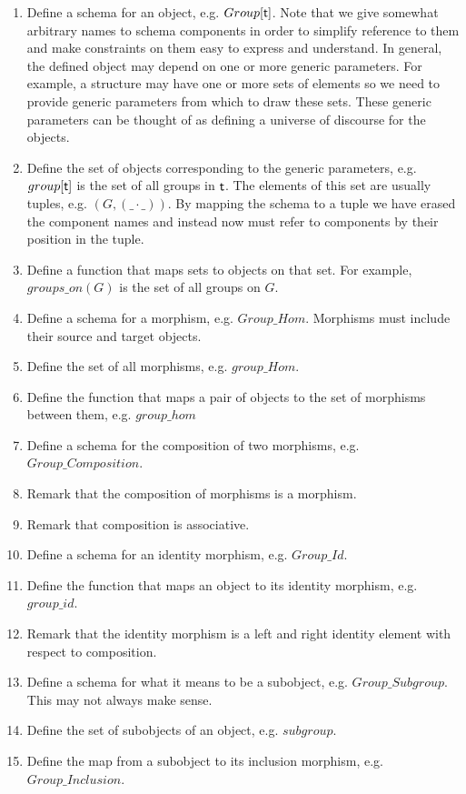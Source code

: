 \documentclass{amsart}
\begin{document}
\begin{enumerate}
	\item Define a schema for an object, e.g. $Group[\mathsf{t}]$. 
	Note that we give somewhat arbitrary names to schema components in order to
	simplify reference to them and make constraints on them easy to express and understand.
	In general, the defined object may depend on one or more generic parameters. 
	For example, a structure may have one or more sets of elements so we need to provide
	generic parameters from which to draw these sets.
	These generic parameters can be thought of as defining a universe of discourse for the objects.
	\item Define the set of objects corresponding to the generic parameters, e.g. $group[\mathsf{t}]$
	is the set of all groups in $\mathsf{t}$.
	The elements of this set are usually tuples, e.g. $(G, (\_ \cdot \_))$. 
	By mapping the schema to a tuple we have erased the component names and 
	instead now must refer to components by their position in the tuple.
	\item Define a function that maps sets to objects on that set. For example, $groups\_on(G)$
	is the set of all groups on $G$.
	\item Define a schema for a morphism, e.g. $Group\_Hom$.
	Morphisms must include their source and target objects.
	\item Define the set of all morphisms, e.g. $group\_Hom$.
	\item Define the function that maps a pair of objects to the set of morphisms between them,
	e.g. $group\_hom$
	\item Define a schema for the composition of two morphisms, e.g. $Group\_Composition$.
	\item Remark that the composition of morphisms is a morphism.
	\item Remark that composition is associative.
	\item Define a schema for an identity morphism, e.g. $Group\_Id$.
	\item Define the function that maps an object to its identity morphism, e.g. $group\_id$.
	\item Remark that the identity morphism is a left and right identity element with respect to
	composition.
	\item Define a schema for what it means to be a subobject, e.g. $Group\_Subgroup$. 
	This may not always make sense.
	\item Define the set of subobjects of an object, e.g. $subgroup$.
	\item Define the map from a subobject to its inclusion morphism, e.g. $Group\_Inclusion$.

\end{enumerate}
\end{document}
